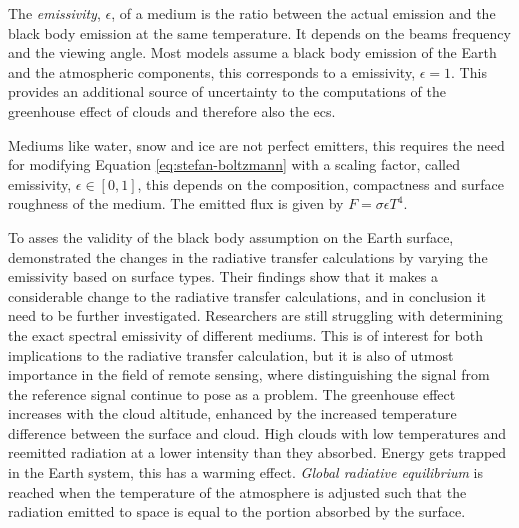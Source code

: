 The \textit{emissivity}, $\epsilon$, of a medium is the ratio between the actual emission and the black body emission at the same temperature. It depends on the beams frequency and the viewing angle. Most models assume a black body emission of the Earth and the atmospheric components, this corresponds to a emissivity, $\epsilon=1$. This provides an additional source of uncertainty to the computations of the greenhouse effect of clouds and therefore also the \acrshort{ecs}.

Mediums like water, snow and ice are not perfect emitters, this requires the need for modifying Equation \eqref{eq:stefan-boltzmann} with a scaling factor, called emissivity, $\epsilon \in [0, 1]$, this depends on the composition, compactness and surface roughness of the medium. The emitted flux is given by $ F = \sigma \epsilon T ^4$. 

To asses the validity of the black body assumption on the Earth surface,  demonstrated the changes in the radiative transfer calculations by varying the emissivity based on surface types. Their findings show that it makes a considerable change to the radiative transfer calculations, and in conclusion it need to be further investigated. Researchers are still struggling with determining the exact spectral emissivity of different mediums. This is of interest for both implications to the radiative transfer calculation, but it is also of utmost importance in the field of remote sensing, where distinguishing the signal from the reference signal continue to pose as a problem.
The greenhouse effect increases with the cloud altitude, enhanced by the increased temperature difference between the surface and cloud. High clouds with low temperatures and reemitted radiation at a lower intensity than they absorbed. Energy gets trapped in the Earth system, this has a warming effect. 
\textit{Global radiative equilibrium} is reached when the temperature of the atmosphere is adjusted such that the radiation emitted to space is equal to the portion absorbed by the surface.

